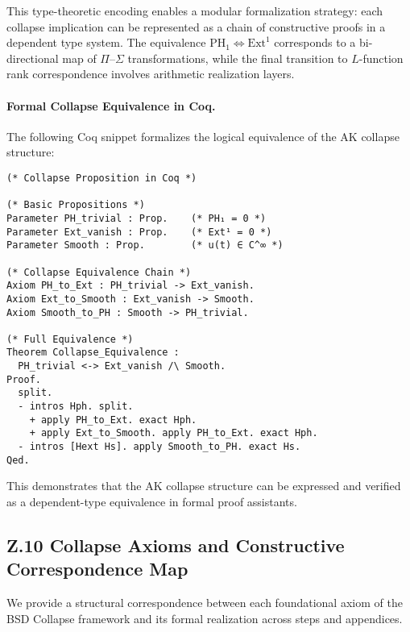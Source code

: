 \begin{remark}
This type-theoretic encoding enables a modular formalization strategy: each collapse implication can be represented as a chain of constructive proofs in a dependent type system.  
The equivalence \( \mathrm{PH}_1 \Longleftrightarrow \mathrm{Ext}^1 \) corresponds to a bi-directional map of $\Pi$–$\Sigma$ transformations, while the final transition to $L$-function rank correspondence involves arithmetic realization layers.
\end{remark}

\paragraph{Formal Collapse Equivalence in Coq.}

The following Coq snippet formalizes the logical equivalence of the AK collapse structure:

\begin{lstlisting}[language=Coq, caption=Collapse Structure in Coq Type Theory]
(* Collapse Proposition in Coq *)

(* Basic Propositions *)
Parameter PH_trivial : Prop.    (* PH₁ = 0 *)
Parameter Ext_vanish : Prop.    (* Ext¹ = 0 *)
Parameter Smooth : Prop.        (* u(t) ∈ C^∞ *)

(* Collapse Equivalence Chain *)
Axiom PH_to_Ext : PH_trivial -> Ext_vanish.
Axiom Ext_to_Smooth : Ext_vanish -> Smooth.
Axiom Smooth_to_PH : Smooth -> PH_trivial.

(* Full Equivalence *)
Theorem Collapse_Equivalence :
  PH_trivial <-> Ext_vanish /\ Smooth.
Proof.
  split.
  - intros Hph. split.
    + apply PH_to_Ext. exact Hph.
    + apply Ext_to_Smooth. apply PH_to_Ext. exact Hph.
  - intros [Hext Hs]. apply Smooth_to_PH. exact Hs.
Qed.
\end{lstlisting}

This demonstrates that the AK collapse structure  
can be expressed and verified as a dependent-type equivalence in formal proof assistants.




\subsection*{Z.10 Collapse Axioms and Constructive Correspondence Map}

We provide a structural correspondence between each foundational axiom  
of the BSD Collapse framework and its formal realization across steps and appendices.

